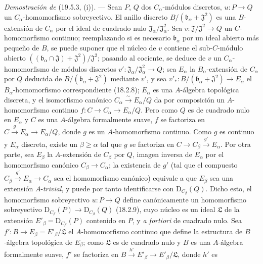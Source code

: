 \begin{env}[19.5.6.1]
\label{0.19.5.6.1-fr}
\emph{Demostración de} (19.5.3, (i)). --- Sean $P$, $Q$ dos $C_\alpha$-módulos discretos,
$u:P\to Q$ un $C_\alpha$-homomorfismo sobreyectivo. El anillo discreto
$B/(\mathfrak b_\alpha+\mathfrak J^2)$ es una $B$-extensión de $C_\alpha$ por
el ideal de cuadrado nulo $\mathfrak J_\alpha/\mathfrak J_\alpha^2$. Sea
$v:\mathfrak J/\mathfrak J^2\to Q$ un $C$-homomorfismo continuo; reemplazando
si es necesario $\mathfrak b_\alpha$ por un ideal abierto más pequeño de $B$, se puede
suponer que el núcleo de $v$ contiene el sub-$C$-módulo abierto
$((\mathfrak b_\alpha\cap\mathfrak J)+\mathfrak J^2)/\mathfrak J^2$;
pasando al cociente, se deduce de $v$ un $C_\alpha$-homomorfismo de módulos
discretos $v':\mathfrak J_\alpha/\mathfrak J_\alpha^2\to Q$; sea
$E_\alpha$ la $B_\alpha$-extensión de $C_\alpha$ por $Q$ deducida de
$B/(\mathfrak b_\alpha+\mathfrak J^2)$ mediante $v'$, y sea
$v'_*:B/(\mathfrak b_\alpha+\mathfrak J^2)\to E_\alpha$ el
$B_\alpha$-homomorfismo correspondiente (18.2.8); $E_\alpha$ es una
$A$-álgebra topológica discreta, y el isomorfismo canónico
$C_\alpha\xrightarrow{\sim}E_\alpha/Q$ da por composición un
$A$-homomorfismo continuo $f:C\to C_\alpha\to E_\alpha/Q$. Pero como $Q$ es
de cuadrado nulo en $E_\alpha$ y $C$ es una $A$-álgebra formalmente
suave, $f$ se factoriza en $C\xrightarrow{g}E_\alpha\to E_\alpha/Q$, donde $g$
es un $A$-homomorfismo continuo. Como $g$ es continuo y $E_\alpha$ discreta,
existe un $\beta\geq\alpha$ tal que $g$ se factoriza en
$C\to C_\beta\xrightarrow{g'}E_\alpha$. Por otra parte, sea $E_\beta$ la
$A$-extensión de $C_\beta$ por $Q$, imagen inversa de $E_\alpha$ por
el homomorfismo canónico $C_\beta\to C_\alpha$; la existencia de $g'$ (tal que
el compuesto $C_\beta\xrightarrow{g'}E_\alpha\to C_\alpha$ sea el homomorfismo canónico)
equivale a que $E_\beta$ sea una extensión $A$-\emph{trivial}, y puede
por tanto identificarse con $\mathrm D_{C_\beta}(Q)$. Dicho esto, el homomorfismo
sobreyectivo $u:P\to Q$ define canónicamente un 
homomorfismo sobreyectivo
$\mathrm D_{C_\beta}(P)\to\mathrm D_{C_\beta}(Q)$ (18.2.9), cuyo núcleo es
un ideal $\mathfrak L$ de la extensión $E'_\beta=\mathrm D_{C_\beta}(P)$
contenido en $P$, y \emph{a fortiori} de cuadrado nulo. Sea
$f':B\to E_\beta=E'_\beta/\mathfrak L$ el $A$-homomorfismo continuo que define
la estructura de $B$-álgebra topológica de $E_\beta$; como $\mathfrak L$ es
de cuadrado nulo y $B$ es una $A$-álgebra formalmente suave, $f'$ se
factoriza en $B\xrightarrow{h'}E'_\beta\to E'_\beta/\mathfrak L$, donde $h'$ es

\end{env}
